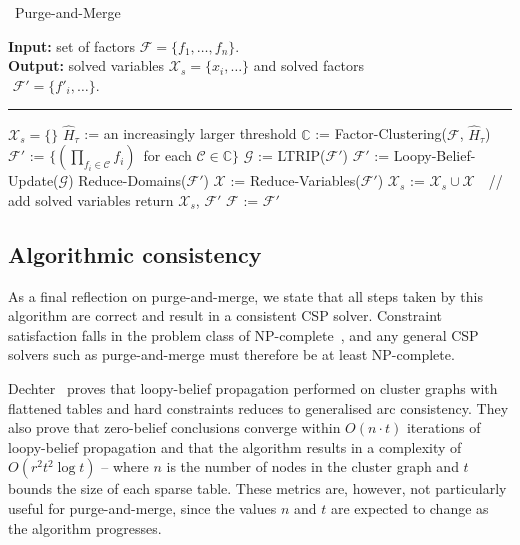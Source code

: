 \documentclass{ieeeaccess}
\begin{document}
{	\begin{algorithm}[h!]
		\caption{\ Purge-and-Merge}
			{\bf Input:} set of factors $\mathcal{F} =\{f_1, \ldots, f_n\}$. \\
			{\bf Output:} solved variables $\mathcal{X}_s = \{x_i, \ldots \}$ and
			solved factors 
			\\${}$\hspace{3.49em} $\mathcal{F}' = \{f'_i, \ldots \}$.
		\vspace{-0.5em}
		\\
		\rule{\columnwidth}{0.45pt}
		\begin{algorithmic}[1]
			\State $\mathcal{X}_s = \{\}$
			\State $\hat{H}_\tau$ := an increasingly larger threshold
			\State $\mathds{C}$ := Factor-Clustering($\mathcal{F}$, $\hat{H}_\tau$)
			\State $\mathcal{F}'$ := $\{(\prod_{f_i \in \mathcal{C}} f_i)\,$ for each $\mathcal{C} \in \mathds{C} \}$
			\State $\mathcal{G}$ := LTRIP($\mathcal{F}'$)
			\State $\mathcal{F}'$ := Loopy-Belief-Update($\mathcal{G}$)
			\State Reduce-Domains($\mathcal{F}'$)
			\State $\mathcal{X}$ := Reduce-Variables($\mathcal{F}'$)
			\State $\mathcal{X}_s$ := $\mathcal{X}_s \cup \mathcal{X}$\ \, {\color{blue1}// add solved variables}
			\State return $\mathcal{X}_s$, $\mathcal{F}'$
			\EndIf
			\State $\mathcal{F}$ := $\mathcal{F}'$
			\EndWhile
		\end{algorithmic}\label{alg:purgeandmerge}
	\end{algorithm}

	
	\subsection{Algorithmic consistency}
	As a final reflection on purge-and-merge, we state that all steps taken by this algorithm are correct and result in a consistent CSP solver. Constraint satisfaction falls in the problem class of NP-complete~\cite{constraintnetworks}, and any general CSP solvers such as purge-and-merge must therefore be at least NP-complete.
	
	Dechter~\cite{dechter2010on} proves that loopy-belief propagation performed on cluster graphs with flattened tables and hard constraints reduces to generalised arc consistency. They also prove that zero-belief conclusions converge within $O(n \cdot t)$ iterations of loopy-belief propagation and that the algorithm results in a complexity of $O(r^2 t^2 \log t)$ -- where $n$ is the number of nodes in the cluster graph and $t$ bounds the size of each sparse table. These metrics are, however, not particularly useful for purge-and-merge, since the values $n$ and $t$ are expected to change as the algorithm progresses.
	
}
\end{document}
